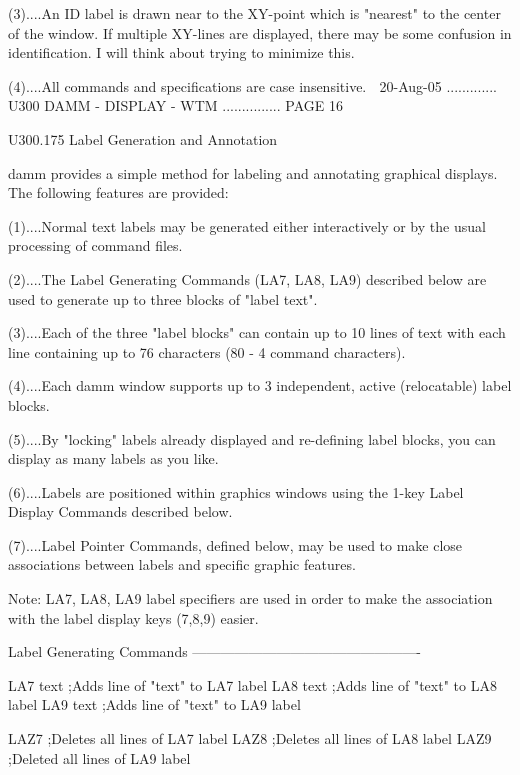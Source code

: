    (3)....An  ID label is drawn near to the XY-point which is "nearest" to the
          center of the window. If multiple XY-lines are displayed, there  may
          be  some  confusion  in identification. I will think about trying to
          minimize this.
 
   (4)....All commands and specifications are case insensitive.
    
   20-Aug-05 ............. U300  DAMM - DISPLAY - WTM ............... PAGE  16
 
 
   U300.175  Label Generation and Annotation
 
   damm provides  a  simple  method  for  labeling  and  annotating  graphical
   displays. The following features are provided:
 
   (1)....Normal  text  labels may be generated either interactively or by the
          usual processing of command files.
 
   (2)....The Label Generating Commands (LA7, LA8, LA9)  described  below  are
          used to generate up to three blocks of "label text".
 
   (3)....Each  of the three "label blocks" can contain up to 10 lines of text
          with each line containing up  to  76  characters  (80  -  4  command
          characters).
 
   (4)....Each  damm window supports up to 3 independent, active (relocatable)
          label blocks.
 
   (5)....By "locking" labels already displayed and re-defining label  blocks,
          you can display as many labels as you like.
 
   (6)....Labels  are positioned within graphics windows using the 1-key Label
          Display Commands described below.
 
   (7)....Label Pointer Commands, defined below, may be  used  to  make  close
          associations between labels and specific graphic features.
 
   Note:  LA7,  LA8,  LA9  label  specifiers  are  used  in  order to make the
   association with the label display keys (7,8,9) easier.
 
   Label Generating Commands -------------------------------------------------
 
   LA7  text   ;Adds line of "text" to LA7 label
   LA8  text   ;Adds line of "text" to LA8 label
   LA9  text   ;Adds line of "text" to LA9 label
 
   LAZ7        ;Deletes all lines of   LA7 label
   LAZ8        ;Deletes all lines of   LA8 label
   LAZ9        ;Deleted all lines of   LA9 label
 
